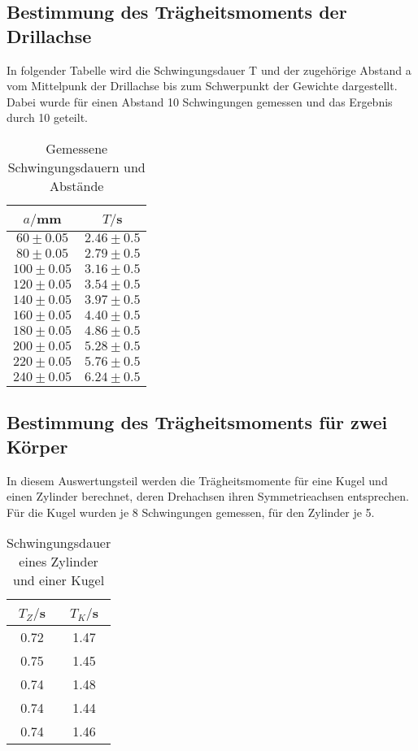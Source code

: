 \subsection{Bestimmung des Trägheitsmoments der Drillachse}
In folgender Tabelle wird die Schwingungsdauer T und der zugehörige Abstand a vom Mittelpunk der Drillachse bis 
zum Schwerpunkt der Gewichte dargestellt. Dabei wurde für einen Abstand 10 Schwingungen gemessen und das Ergebnis
durch 10 geteilt.


\begin{table}[H]
  \centering
  \caption{Gemessene Schwingungsdauern und Abstände}
  \label{tab:Gemessene Schwingungsdauern und Abstände}
  \begin{tabular}{c c}
    \toprule
    $a/$mm & $T/$s \\
    \midrule
     $60 \pm 0.05$ & $2.46 \pm 0.5$ \\ 
     $80 \pm 0.05$ & $2.79 \pm 0.5$ \\
    $100 \pm 0.05$ & $3.16 \pm 0.5$ \\
    $120 \pm 0.05$ & $3.54 \pm 0.5$ \\
    $140 \pm 0.05$ & $3.97 \pm 0.5$ \\
    $160 \pm 0.05$ & $4.40 \pm 0.5$ \\
    $180 \pm 0.05$ & $4.86 \pm 0.5$ \\
    $200 \pm 0.05$ & $5.28 \pm 0.5$ \\
    $220 \pm 0.05$ & $5.76 \pm 0.5$ \\
    $240 \pm 0.05$ & $6.24 \pm 0.5$ \\
    \bottomrule
  \end{tabular}
\end{table} 







\subsection{Bestimmung des Trägheitsmoments für zwei Körper}
In diesem Auswertungsteil werden die Trägheitsmomente für eine Kugel und einen 
Zylinder berechnet, deren Drehachsen ihren Symmetrieachsen entsprechen.
Für die Kugel wurden je 8 Schwingungen gemessen, für den Zylinder je 5.
\begin{table}[H]
  \centering
  \caption{Schwingungsdauer eines Zylinder und einer Kugel}
  \label{tab:Schwingungsdauer von Zylinder und Kugel}
  \begin{tabular}{c c}
    \toprule
    $T_Z/$s & $T_K/$s \\
    \midrule
    0.72 & 1.47 \\
    0.75 & 1.45 \\
    0.74 & 1.48 \\
    0.74 & 1.44 \\
    0.74 & 1.46 \\
    \bottomrule
  \end{tabular}
\end{table}




